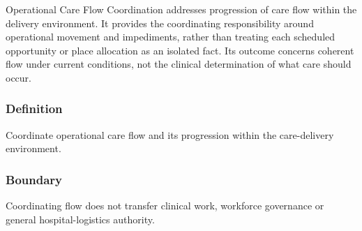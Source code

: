Operational Care Flow Coordination addresses progression of care flow within the delivery environment. It provides the coordinating responsibility around operational movement and impediments, rather than treating each scheduled opportunity or place allocation as an isolated fact. Its outcome concerns coherent flow under current conditions, not the clinical determination of what care should occur.

\subsubsection*{Definition}

Coordinate operational care flow and its progression within the care-delivery environment.

\subsubsection*{Boundary}

Coordinating flow does not transfer clinical work, workforce governance or general hospital-logistics authority.

